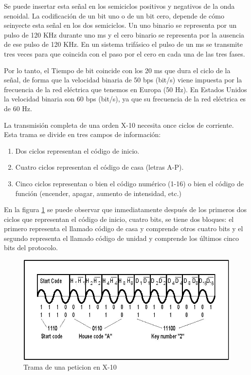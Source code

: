 Se puede insertar esta señal en los semiciclos positivos y negativos de
la onda senoidal. La codificación de un bit uno o de un bit cero, depende de
cómo seinyecte esta señal en los dos semiciclos. Un uno binario se representa
por un pulso de 120 KHz durante uno ms y el cero binario se representa por la
ausencia de ese pulso de 120 KHz. En un sistema trif\'asico el pulso de un ms
se transmite tres veces para que coincida con el paso por el cero en cada una
de las tres fases.


Por lo tanto, el Tiempo de bit coincide con los 20 ms que dura el ciclo de
la señal, de forma que la velocidad binaria de 50 bps (bit/s) viene impuesta por
la frecuencia de la red eléctrica que tenemos en Europa (50 Hz). En Estados
Unidos la velocidad binaria son 60 bps (bit/s), ya que su frecuencia de la red
eléctrica es de 60 Hz.


La transmisión completa de una orden X-10 necesita once ciclos de
corriente. Esta trama se divide en tres campos de información:
\begin{enumerate}
	\item Dos ciclos representan el código de inicio.
	\item Cuatro ciclos representan el código de casa (letras A-P).
	\item Cinco ciclos representan o bien el código numérico (1-16) o bien
el código de función (encender, apagar, aumento de intensidad,
etc.)
\end{enumerate}


En la figura \ref{fig:trama_x10} se puede observar que inmediatamente
después de los primeros dos ciclos que representan el código de inicio,
cuatro bits, se tiene dos bloques: el primero representa el llamado código
de casa y comprende otros cuatro bits y el segundo representa el
llamado código de unidad y comprende los últimos cinco bits del
protocolo.

\begin{figure}[htbp]
	\centering
		\includegraphics{imagenes/trama_x10.jpg}
	\caption{Trama de una peticion en X-10}
	\label{fig:trama_x10}
\end{figure}



